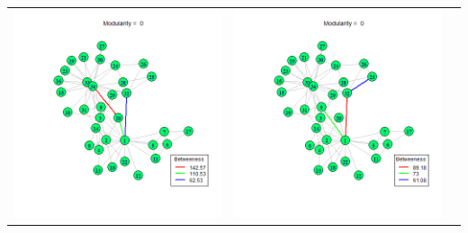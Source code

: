 \documentclass[letterpaper,11pt]{report}
\begin{document}
\begin{savenotes}
\begin{table}[htbp]
	\centering
		\begin{tabular}{ccc}
			\includegraphics[scale=0.25]{karateClub-community-0001.png} &
			\includegraphics[scale=0.25]{karateClub-community-0002.png} & 

\end{tabular}
\end{table}
\end{savenotes}
\end{document}

